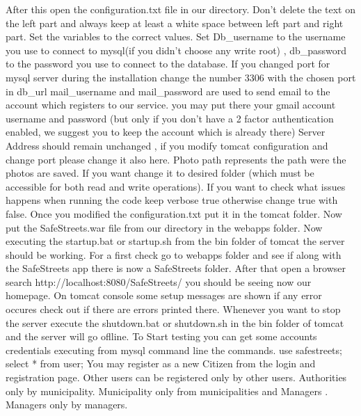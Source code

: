 After this open the configuration.txt file in our directory.
Don't delete the text on the left part and always keep at least a white space between left part and right part.
Set the variables to the correct values. 
Set Db\_username to the username you use to connect to mysql(if you didn't choose any write root) , db\_password to the password you use to connect to the database. If you changed port for mysql server during the installation change the number 3306 with the chosen port in db\_url mail\_username and mail\_password are used to send email to the account which registers to our service. you may put there your gmail account username and password (but only if you don't have a 2 factor authentication enabled, we suggest you to keep the account which is already there)
Server Address should remain unchanged ,  if you modify tomcat configuration and change port please change it also here.
Photo path represents the path were the photos are saved. If you want change it to desired folder (which must be accessible for both read and write operations).
If you want to check what issues happens when running the code keep verbose true  otherwise change true with false. Once you modified the configuration.txt put it in the tomcat  folder.
Now put the SafeStreets.war file from our directory in the webapps folder. Now executing the startup.bat or startup.sh from the bin folder of tomcat the server should be working.
For a first check go to webapps folder and see if along with the SafeStreets app there is now a SafeStreets folder. After that open a browser search  http://localhost:8080/SafeStreets/ you should be seeing now our homepage.
On tomcat console some setup messages are shown if any error occures check out if there are errors printed there.
Whenever you want to stop the server execute the shutdown.bat or shutdown.sh in the bin folder of tomcat and the server will go oflline.
To Start testing you can get some accounts credentials executing from mysql command line the commands.
\newline 
\newline
use safestreets; 
\newline
select * from user;
\newline 
\newline
You may register as a new Citizen from the login and registration page. Other users can be registered only by other users. Authorities only by municipality. Municipality only from municipalities and Managers . Managers only by managers.
 
